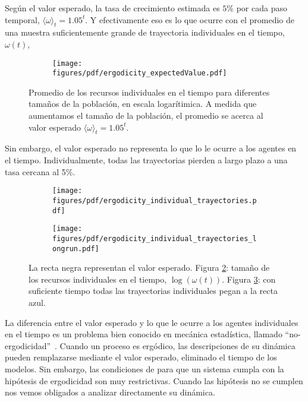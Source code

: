 \documentclass[a4paper,10pt]{article}
\begin{document}
Según el valor esperado, la tasa de crecimiento estimada es $5\%$ por cada paso temporal, $\langle \omega \rangle_t = 1.05^t$.
Y efectivamente eso es lo que ocurre con el promedio de una muestra suficientemente grande de trayectoria individuales en el tiempo, $\omega(t)$, 
\begin{figure}[H]
    \centering
    \begin{subfigure}[b]{0.45\textwidth}
    \texttt{[image: figures/pdf/ergodicity\_expectedValue.pdf]}
    \end{subfigure}
    \caption{
    Promedio de los recursos individuales en el tiempo para diferentes tamaños de la población, en escala logarítimica.
    A medida que aumentamos el tamaño de la población, el promedio se acerca al valor esperado $\langle \omega \rangle_t = 1.05^t$.
    }
    \label{fig:cpr_individual}
\end{figure}

Sin embargo, el valor esperado no representa lo que lo le ocurre a los agentes en el tiempo. 
Individualmente, todas las trayectorias pierden a largo plazo a una tasa cercana al 5\%.
\begin{figure}[H]
    \centering
    \begin{subfigure}[b]{0.45\textwidth}
    \texttt{[image: figures/pdf/ergodicity\_individual\_trayectories.pdf]}
    \caption{}
    \label{fig:ergodicity_individual_trayectories}
    \end{subfigure}
    \begin{subfigure}[b]{0.45\textwidth}
    \texttt{[image: figures/pdf/ergodicity\_individual\_trayectories\_longrun.pdf]}
    \caption{}
    \label{fig:ergodicity_individual_trayectories_longrun}
    \end{subfigure}
    \caption{
    La recta negra representan el valor esperado.
    Figura \ref{fig:ergodicity_individual_trayectories}: tamaño de los recursos individuales en el tiempo, $ \log(\omega(t))$.
    Figura \ref{fig:ergodicity_individual_trayectories_longrun}: con suficiente tiempo todas las trayectorias individuales pegan a la recta azul. 
    }
    \label{fig:cpr_individual}
\end{figure}

La diferencia entre el valor esperado y lo que le ocurre a los agentes individuales en el tiempo es un problema bien conocido en mecánica estadística, llamado ``no-ergodicidad''~\cite{peters2019-ergodicityEconomics}.
Cuando un proceso es ergódico, las descripciones de su dinámica pueden remplazarse mediante el valor esperado, eliminado el tiempo de los modelos.
Sin embargo, las condiciones de para que un sistema cumpla con la hipótesis de ergodicidad son muy restrictivas.
Cuando las hipótesis no se cumplen nos vemos obligados a analizar directamente su dinámica. 
\end{document}
